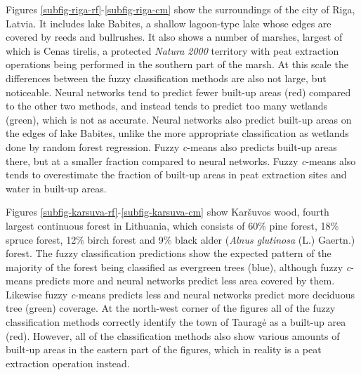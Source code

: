 \documentclass[a4paper,10pt]{book}
\begin{document}
Figures \ref{subfig-riga-rf}-\ref{subfig-riga-cm} show the surroundings of the city of Riga, Latvia. It includes lake Babites, a shallow lagoon-type lake whose edges are covered by reeds and bullrushes. It also shows a number of marshes, largest of which is Cenas tirelis, a protected \textit{Natura 2000} territory with peat extraction operations being performed in the southern part of the marsh. At this scale the differences between the fuzzy classification methods are also not large, but noticeable. Neural networks tend to predict fewer built-up areas (red) compared to the other two methods, and instead tends to predict too many wetlands (green), which is not as accurate. Neural networks also predict built-up areas on the edges of lake Babites, unlike the more appropriate classification as wetlands done by random forest regression. Fuzzy \textit{c}-means also predicts built-up areas there, but at a smaller fraction compared to neural networks. Fuzzy \textit{c}-means also tends to overestimate the fraction of built-up areas in peat extraction sites and water in built-up areas.

Figures \ref{subfig-karsuva-rf}-\ref{subfig-karsuva-cm} show Kar\v{s}uvos wood, fourth largest continuous forest in Lithuania, which consists of 60\% pine forest, 18\% spruce forest, 12\% birch forest and 9\% black alder (\textit{Alnus glutinosa} (L.) Gaertn.) forest. The fuzzy classification predictions show the expected pattern of the majority of the forest being classified as evergreen trees (blue), although fuzzy \textit{c}-means predicts more and neural networks predict less area covered by them. Likewise fuzzy \textit{c}-means predicts less and neural networks predict more deciduous tree (green) coverage. At the north-west corner of the figures all of the fuzzy classification methods correctly identify the town of Taurag\.{e} as a built-up area (red). However, all of the classification methods also show various amounts of built-up areas in the eastern part of the figures, which in reality is a peat extraction operation instead.
\end{document}
